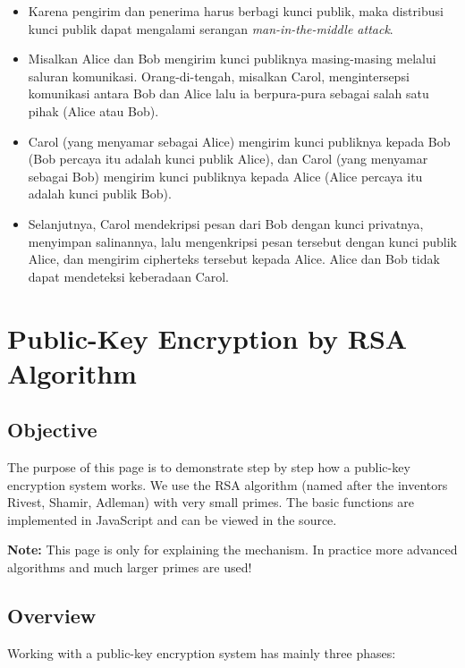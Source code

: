 \documentclass{article}
\begin{document}
\begin{itemize}
    \item Karena pengirim dan penerima harus berbagi kunci publik, maka distribusi kunci publik dapat mengalami serangan \textit{man-in-the-middle attack}.
    \item Misalkan Alice dan Bob mengirim kunci publiknya masing-masing melalui saluran komunikasi. Orang-di-tengah, misalkan Carol, mengintersepsi komunikasi antara Bob dan Alice lalu ia berpura-pura sebagai salah satu pihak (Alice atau Bob).
    \item Carol (yang menyamar sebagai Alice) mengirim kunci publiknya kepada Bob (Bob percaya itu adalah kunci publik Alice), dan Carol (yang menyamar sebagai Bob) mengirim kunci publiknya kepada Alice (Alice percaya itu adalah kunci publik Bob).
    \item Selanjutnya, Carol mendekripsi pesan dari Bob dengan kunci privatnya, menyimpan salinannya, lalu mengenkripsi pesan tersebut dengan kunci publik Alice, dan mengirim cipherteks tersebut kepada Alice. Alice dan Bob tidak dapat mendeteksi keberadaan Carol.
\end{itemize}

\newpage


\section*{Public-Key Encryption by RSA Algorithm}

\subsection*{Objective}
The purpose of this page is to demonstrate step by step how a public-key encryption system works. We use the RSA algorithm (named after the inventors Rivest, Shamir, Adleman) with very small primes. The basic functions are implemented in JavaScript and can be viewed in the source.

\textbf{Note:} This page is only for explaining the mechanism. In practice more advanced algorithms and much larger primes are used!

\subsection*{Overview}
Working with a public-key encryption system has mainly three phases:
\end{document}
